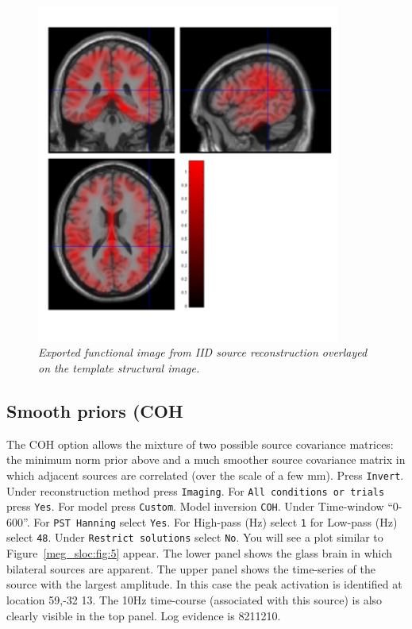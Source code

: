 \begin{figure}
\begin{center}
\includegraphics[width=100mm]{meg_sloc/slide4}
\caption{\em Exported functional image from IID source reconstruction overlayed on the template structural image.\label{meg_sloc:fig:4}}
\end{center}
\end{figure}

\subsection{Smooth priors (COH}
The COH option allows the mixture of two possible source covariance matrices: the minimum norm prior above and a much smoother source covariance matrix in which adjacent sources are correlated (over the scale of a few mm). Press \texttt{Invert}. Under reconstruction method press \texttt{Imaging}. For \texttt{All conditions or trials} press \texttt{Yes}. For model press \texttt{Custom}. Model inversion \texttt{COH}. Under Time-window ``0-600''. For \texttt{PST Hanning} select \texttt{Yes}. For High-pass (Hz) select \texttt{1} for Low-pass (Hz) select \texttt{48}. Under \texttt{Restrict solutions} select \texttt{No}.   You will see a plot similar to Figure~\ref{meg_sloc:fig:5} appear. The lower panel shows the glass brain in which bilateral sources are apparent. The upper panel shows the time-series of the source with the largest amplitude. In this case the peak activation is identified at location 59,-32 13. The 10Hz time-course (associated with this source) is also clearly visible in the top panel.  Log evidence is 8211210.

